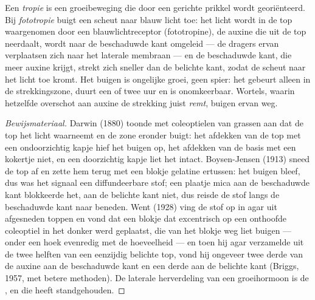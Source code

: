 \begin{proposition}[Fototropie]\label{prop:b2:plant-plasticity:phototropism}
Een \emph{tropie} is een groeibeweging die door een gerichte prikkel wordt
georiënteerd. Bij \emph{fototropie} buigt een scheut naar blauw licht toe:
het licht wordt in de top waargenomen door een blauwlichtreceptor
(fototropine), de auxine die uit de top neerdaalt, wordt naar de
beschaduwde kant omgeleid --- de dragers ervan verplaatsen zich naar het
laterale membraan --- en de beschaduwde kant, die meer auxine krijgt,
strekt zich sneller dan de belichte kant, zodat de scheut naar het licht
toe kromt. Het buigen is ongelijke groei, geen spier: het gebeurt alleen in
de strekkingszone, duurt een of twee uur en is onomkeerbaar. Wortels,
waarin hetzelfde overschot aan auxine de strekking juist \emph{remt},
buigen ervan weg.
\end{proposition}
\begin{proof}[Bewijsmateriaal]
Darwin (1880) toonde met coleoptielen van grassen aan dat de top het licht
waarneemt en de zone eronder buigt: het afdekken van de top met een
ondoorzichtig kapje hief het buigen op, het afdekken van de basis met een
kokertje niet, en een doorzichtig kapje liet het intact. Boysen-Jensen
(1913) sneed de top af en zette hem terug met een blokje gelatine ertussen:
het buigen bleef, dus was het signaal een diffundeerbare stof; een plaatje
mica aan de beschaduwde kant blokkeerde het, aan de belichte kant niet, dus
reisde de stof langs de beschaduwde kant naar beneden. Went (1928) ving de
stof op in agar uit afgesneden toppen en vond dat een blokje dat
excentrisch op een onthoofde coleoptiel in het donker werd geplaatst, die
van het blokje weg liet buigen --- onder een hoek evenredig met de
hoeveelheid --- en toen hij agar verzamelde uit de twee helften van een
eenzijdig belichte top, vond hij ongeveer twee derde van de auxine aan de
beschaduwde kant en een derde aan de belichte kant (Briggs, 1957, met
betere methoden). De laterale herverdeling van een groeihormoon is de
, en die heeft standgehouden.
\end{proof}

